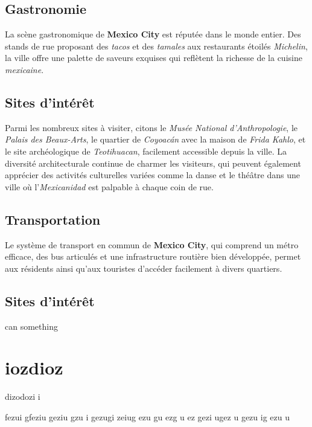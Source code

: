 \documentclass[12pt, a4paper]{article}
\begin{document}
\subsection*{\textbf{Gastronomie}}

La scène gastronomique de \textbf{Mexico City} est réputée dans le monde entier. Des stands de rue proposant des \textit{tacos} et des \textit{tamales} aux restaurants étoilés \textit{Michelin}, la ville offre une palette de saveurs exquises qui reflètent la richesse de la cuisine \textit{mexicaine}.
\subsection*{\textbf{Sites d'intérêt}}

Parmi les nombreux sites à visiter, citons le \textit{Musée National d'Anthropologie}, le \textit{Palais des Beaux-Arts}, le quartier de \textit{Coyoacán} avec la maison de \textit{Frida Kahlo}, et le site archéologique de \textit{Teotihuacan}, facilement accessible depuis la ville.
La diversité architecturale continue de charmer les visiteurs, qui peuvent également apprécier des activités culturelles variées comme la danse et le théâtre dans une ville où l'\textit{Mexicanidad} est palpable à chaque coin de rue. \subsection*{\textbf{Transportation}} Le système de transport en commun de \textbf{Mexico City}, qui comprend un métro efficace, des bus articulés et une infrastructure routière bien développée, permet aux résidents ainsi qu'aux touristes d'accéder facilement à divers quartiers.

\subsection*{\textbf{Sites d'intérêt}}

can something

\section{iozdioz}

dizodozi i

fezui gfeziu geziu 
gzu i
gezugi zeiug ezu
 gu
ezg u
ez gezi ugez
u gezu
ig ezu
u
\end{document}
